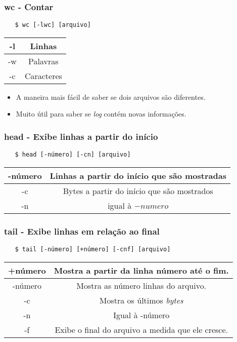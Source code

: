 \documentclass{beamer}
\begin{document}
\begin{frame}[fragile]
   \frametitle{wc - Contar}
   \begin{verbatim}
   $ wc [-lwc] [arquivo]
   \end{verbatim}
   \begin{table}
      \begin{tabular}{ c | c }
         -l & Linhas \\
         \hline 
         -w & Palavras \\
         \hline
         -c & Caracteres \\
      \end{tabular}
   \end{table}
   \begin{itemize}
      \item A maneira mais fácil de saber se dois arquivos são diferentes.
      \item Muito útil para saber se \textit{log} contém novas informações.
   \end{itemize}
\end{frame}

\begin{frame}[fragile]
   \frametitle{head - Exibe linhas a partir do início}
   \begin{verbatim}
   $ head [-número] [-cn] [arquivo] 
   \end{verbatim}
   \begin{table}
      \begin{tabular}{ c | c }
         -número & Linhas a partir do início que são mostradas \\
         \hline 
         -c & Bytes a partir do início que são mostrados \\
         \hline
         -n & igual à $-numero$ \\
      \end{tabular}
   \end{table}
\end{frame}

\begin{frame}[fragile]
   \frametitle{tail - Exibe linhas em relação ao final}
   \begin{verbatim}
   $ tail [-número] [+número] [-cnf] [arquivo] 
   \end{verbatim}
   \begin{table}
      \begin{tabular}{ c | c }
         +número & Mostra a partir da linha \textsf{número} até o fim. \\
         \hline 
         -número & Mostra as \textsf{número} linhas do arquivo. \\
         \hline
         -c & Mostra os últimos \textit{bytes} \\
         \hline
         -n & Igual à -número \\
         \hline
         -f & Exibe o final do arquivo a medida que ele cresce. \\
      \end{tabular}
   \end{table}
\end{frame}
\end{document}
